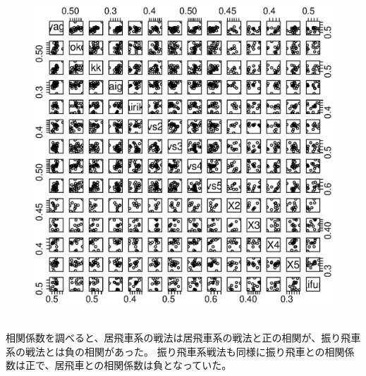 \documentclass[11pt,a4paper,dvipdfmx]{jsarticle}
\begin{document}
\begin{figure}[h]
    \centering
    \includegraphics[width=1\textwidth]{graph/pairs-raw.eps}
\end{figure}
\\
相関係数を調べると、居飛車系の戦法は居飛車系の戦法と正の相関が、振り飛車系の戦法とは負の相関があった。
振り飛車系戦法も同様に振り飛車との相関係数は正で、居飛車との相関係数は負となっていた。
\\
\end{document}
